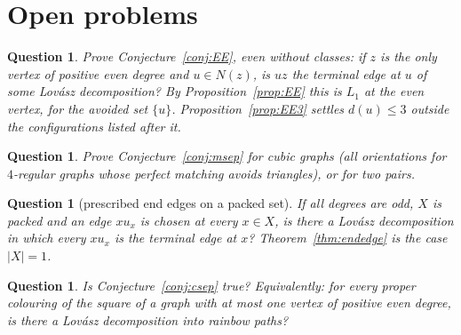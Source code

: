 \documentclass[11pt]{amsart}
\newtheorem{question}[theorem]{Question}
\theoremstyle{definition}
\begin{document}
\section{Open problems}\label{sec:open}

\begin{question}\label{q:EE}
Prove Conjecture~\ref{conj:EE}, even without classes: if $z$ is the only vertex of positive even degree
and $u\in N(z)$, is $uz$ the terminal edge at $u$ of some Lov\'asz decomposition? By
Proposition~\ref{prop:EE} this is $L_1$ at the even vertex, for the avoided set $\{u\}$.
Proposition~\ref{prop:EE3} settles $d(u)\le3$ outside the configurations listed after it.
\end{question}

\begin{question}\label{q:cubic}
Prove Conjecture~\ref{conj:msep} for cubic graphs (all orientations for $4$-regular graphs whose
perfect matching avoids triangles), or for two pairs.
\end{question}

\begin{question}[prescribed end edges on a packed set]\label{q:pe}
If all degrees are odd, $X$ is packed and an edge $xu_x$ is chosen at every $x\in X$, is there a Lov\'asz
decomposition in which every $xu_x$ is the terminal edge at $x$? Theorem~\ref{thm:endedge} is the case
$|X|=1$.
\end{question}

\begin{question}\label{q:csep}
Is Conjecture~\ref{conj:csep} true? Equivalently: for every proper colouring of the square of a graph
with at most one vertex of positive even degree, is there a Lov\'asz decomposition into rainbow paths?
\end{question}
\end{document}
